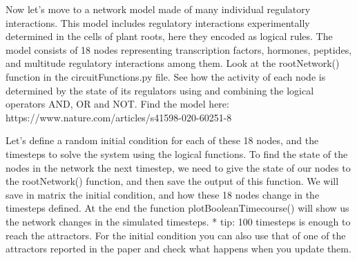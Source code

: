 \documentclass[
  letterpaper,
  DIV=11,
  numbers=noendperiod]{scrreprt}
\theoremstyle{definition}
\theoremstyle{remark}
\begin{document}
Now let's move to a network model made of many individual regulatory
interactions. This model includes regulatory interactions experimentally
determined in the cells of plant roots, here they encoded as logical
rules. The model consists of 18 nodes representing transcription
factors, hormones, peptides, and multitude regulatory interactions among
them. Look at the rootNetwork() function in the circuitFunctions.py
file. See how the activity of each node is determined by the state of
its regulators using and combining the logical operators AND, OR and
NOT. Find the model here:
https://www.nature.com/articles/s41598-020-60251-8

Let's define a random initial condition for each of these 18 nodes, and
the timesteps to solve the system using the logical functions. To find
the state of the nodes in the network the next timestep, we need to give
the state of our nodes to the rootNetwork() function, and then save the
output of this function. We will save in matrix the initial condition,
and how these 18 nodes change in the timesteps defined. At the end the
function plotBooleanTimecourse() will show us the network changes in the
simulated timesteps. * tip: 100 timesteps is enough to reach the
attractors. For the initial condition you can also use that of one of
the attractors reported in the paper and check what happens when you
update them.
\end{document}
